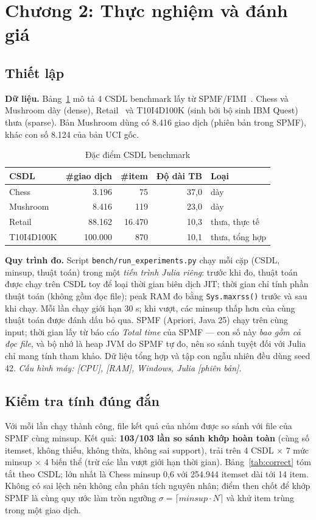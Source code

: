 \documentclass[10pt,twocolumn,letterpaper]{article}
\begin{document}
\section{Chương 2: Thực nghiệm và đánh giá}\label{sec:exp}
\subsection{Thiết lập}
\textbf{Dữ liệu.} Bảng~\ref{tab:data} mô tả 4 CSDL benchmark lấy từ SPMF/FIMI~\cite{goethals2003,zheng2001}. Chess và Mushroom dày (dense), Retail~\cite{brijs1999} và T10I4D100K (sinh bởi bộ sinh IBM Quest) thưa (sparse). Bản Mushroom dùng có 8{.}416 giao dịch (phiên bản trong SPMF), khác con số 8{.}124 của bản UCI gốc.

\begin{table}[t]
\centering
\caption{Đặc điểm CSDL benchmark}
\label{tab:data}
\footnotesize
\begin{tabular}{@{}lrrrl@{}}
\toprule
CSDL & \#giao dịch & \#item & Độ dài TB & Loại \\ \midrule
Chess & 3{.}196 & 75 & 37,0 & dày \\
Mushroom & 8{.}416 & 119 & 23,0 & dày \\
Retail & 88{.}162 & 16{.}470 & 10,3 & thưa, thực tế \\
T10I4D100K & 100{.}000 & 870 & 10,1 & thưa, tổng hợp \\
\bottomrule
\end{tabular}
\end{table}

\textbf{Quy trình đo.} Script \texttt{bench/run\_experiments.py} chạy mỗi cặp (CSDL, minsup, thuật toán) trong một \emph{tiến trình Julia riêng}: trước khi đo, thuật toán được chạy trên CSDL toy để loại thời gian biên dịch JIT; thời gian chỉ tính phần thuật toán (không gồm đọc file); peak RAM đo bằng \texttt{Sys.maxrss()} trước và sau khi chạy. Mỗi lần chạy giới hạn 30 s; khi vượt, các minsup thấp hơn của cùng thuật toán được đánh dấu bỏ qua. SPMF (Apriori, Java 25) chạy trên cùng input; thời gian lấy từ báo cáo \emph{Total time} của SPMF — con số này \emph{bao gồm cả đọc file}, và bộ nhớ là heap JVM do SPMF tự đo, nên so sánh tuyệt đối với Julia chỉ mang tính tham khảo. Dữ liệu tổng hợp và tập con ngẫu nhiên đều dùng seed 42. \textit{Cấu hình máy: [CPU], [RAM], Windows, Julia [phiên bản].}

\subsection{Kiểm tra tính đúng đắn}
Với mỗi lần chạy thành công, file kết quả của nhóm được so sánh với file của SPMF cùng minsup. Kết quả: \textbf{103/103 lần so sánh khớp hoàn toàn} (cùng số itemset, không thiếu, không thừa, không sai support), trải trên 4 CSDL $\times$ 7 mức minsup $\times$ 4 biến thể (trừ các lần vượt giới hạn thời gian). Bảng~\ref{tab:correct} tóm tắt theo CSDL; lớn nhất là Chess minsup 0,6 với 254{.}944 itemset dài tới 14 item. Không có sai lệch nên không cần phân tích nguyên nhân; điểm then chốt để khớp SPMF là cùng quy ước làm tròn ngưỡng $\sigma=\lceil\mathit{minsup}\cdot N\rceil$ và khử item trùng trong một giao dịch.
\end{document}
